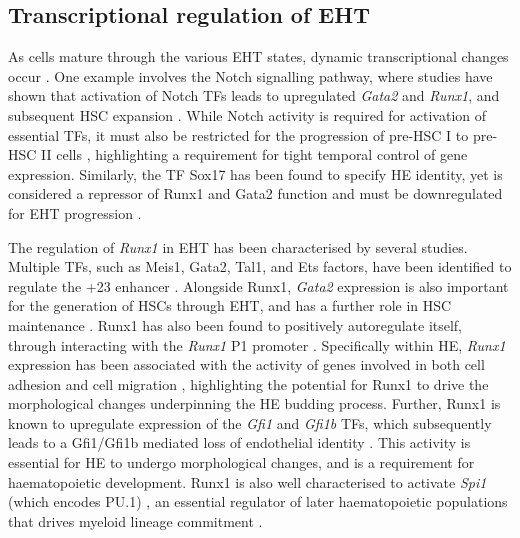 \subsection{Transcriptional regulation of EHT}

As cells mature through the various EHT states, dynamic transcriptional changes occur \citep{goode_dynamic_2016, ottersbach_endothelial--haematopoietic_2019, swiers_early_2013, solaimani_kartalaei_whole-transcriptome_2015, baron_single-cell_2018, zhu_developmental_2020, zeng_tracing_2019, bergiers_single-cell_2018, gao_transcriptional_2020, vink_iterative_2020, hou_embryonic_2020}. One example involves the Notch signalling pathway, where studies have shown that activation of Notch TFs leads to upregulated \textit{Gata2} and \textit{Runx1}, and subsequent HSC expansion \citep{burns_hematopoietic_2005, robert-moreno_rbpjkappa-dependent_2005, guiu_hes_2013}. While Notch activity is required for activation of essential TFs, it must also be restricted for the progression of pre-HSC I to pre-HSC II cells \citep{souilhol_developing_2016}, highlighting a requirement for tight temporal control of gene expression. Similarly, the TF Sox17 has been found to specify HE identity, yet is considered a repressor of Runx1 and Gata2 function and must be downregulated for EHT progression \citep{clarke_expression_2013, lizama_repression_2015, ottersbach_endothelial--haematopoietic_2019}. 

The regulation of \textit{Runx1} in EHT has been characterised by several studies. Multiple TFs, such as Meis1, Gata2, Tal1, and Ets factors, have been identified to regulate the +23 enhancer \citep{nottingham_runx1-mediated_2007, schutte_experimentally_2016}. Alongside Runx1, \textit{Gata2} expression is also important for the generation of HSCs through EHT, and has a further role in HSC maintenance \citep{tsai_early_1994, ling_gata-2_2004}. Runx1 has also been found to positively autoregulate itself, through interacting with the \textit{Runx1} P1 promoter \citep{martinez_transcriptional_2016}. Specifically within HE, \textit{Runx1} expression has been associated with the activity of genes involved in both cell adhesion and cell migration \citep{lie-a-ling_runx1_2014}, highlighting the potential for Runx1 to drive the morphological changes underpinning the HE budding process. Further, Runx1 is known to upregulate expression of the \textit{Gfi1} and \textit{Gfi1b} TFs, which subsequently leads to a Gfi1/Gfi1b mediated loss of endothelial identity \citep{wilson_gfi1_2010, lancrin_gfi1_2012}. This activity is essential for HE to undergo morphological changes, and is a requirement for haematopoietic development. Runx1 is also well characterised to activate \textit{Spi1} (which encodes PU.1) \citep{huang_pu1_2008}, an essential regulator of later haematopoietic populations that drives myeloid lineage commitment \citep{imperato_runx1pu1_2015}.
 
